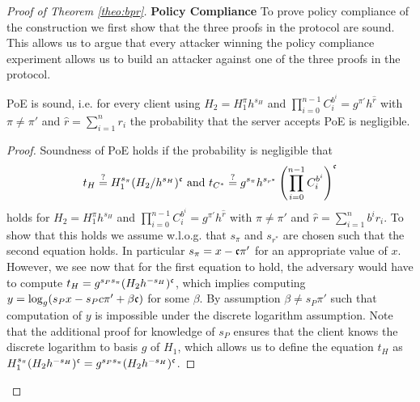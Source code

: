 \begin{proof}[Proof of Theorem \ref{theo:bpr}]
\textbf{Policy Compliance}
To prove policy compliance of the construction we first show that the three proofs in the protocol are sound.
This allows us to argue that every attacker winning the policy compliance experiment allows us to build an attacker against one of the three proofs in the protocol.

\begin{claim}
  \ac{PoE} is sound, i.e. for every client using $H_2=H_1^{\pi}h^{s_H}$ and $\prod_{i=0}^{n-1} C^{b^i}_i=g^{\pi'}h^{\hat{r}}$ with $\pi\not=\pi'$ and $\hat{r}=\sum_{i=1}^n r_i$ the probability that the server accepts \ac{PoE} is negligible.
\end{claim}

\begin{proof}
Soundness of \ac{PoE} holds if the probability is negligible that
\[ 
  t_H\stackrel{?}{=} H_1^{s_\pi}(H_2/h^{s_H})^\mathfrak{c} \text{ and } t_{C^\ast} \stackrel{?}{=} g^{s_\pi}h^{s_{r^\ast}}\left(\prod_{i=0}^{n-1} C^{b^i}_i \right)^\mathfrak{c} 
\]
holds for $H_2=H_1^{\pi}h^{s_H}$ and $\prod_{i=0}^{n-1} C^{b^i}_i=g^{\pi'}h^{\hat{r}}$ with $\pi\not=\pi'$ and $\hat{r}=\sum_{i=1}^n b^i r_i$.
To show that this holds we assume w.l.o.g. that $s_\pi$ and $s_{r^\ast}$ are chosen such that the second equation holds.
In particular $s_\pi=x-\mathfrak{c}\pi'$ for an appropriate value of $x$.
However, we see now that for the first equation to hold, the adversary would have to compute $t_H=g^{s_P s_\pi}(H_2h^{-s_H})^\mathfrak{c}$, which implies computing $y=\log_g(s_P x-s_P c\pi'+\beta \mathfrak{c})$ for some $\beta$.
By assumption $\beta\not= s_P\pi'$ such that computation of $y$ is impossible under the discrete logarithm assumption.
Note that the additional proof for knowledge of $s_P$ ensures that the client knows the discrete logarithm to basis $g$ of $H_1$, which allows us to define the equation $t_H$ as $H_1^{s_\pi}(H_2h^{-s_H})^\mathfrak{c}=g^{s_P s_\pi}(H_2h^{-s_H})^\mathfrak{c}$.

\end{proof}


\end{proof}
